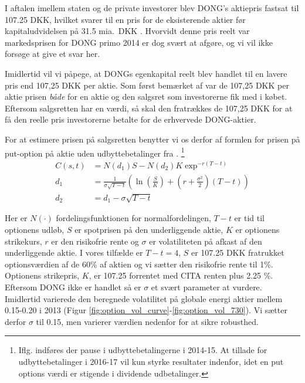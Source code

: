 \documentclass{article}
\begin{document}
I aftalen imellem staten og de private investorer blev  DONG's aktiepris fastsat til 107.25 DKK, hvilket svarer til en pris for de eksisterende aktier før kapitaludvidelsen på 31.5 mia.\ DKK \citep{FM2013a}. Hvorvidt denne pris reelt var markedsprisen for DONG primo 2014 er dog svært at afgøre, og vi vil ikke forsøge at give et svar her. 

Imidlertid vil vi påpege, at DONGs egenkapital reelt blev handlet til en lavere pris end 107,25 DKK per aktie. Som først bemærket af \cite{Moeller2014} var de 107,25 DKK per aktie prisen \emph{både} for en aktie og den salgsret som investorerne fik med i købet. Eftersom salgsretten har en værdi, så skal den fratrækkes de 107,25 DKK for at få den reelle pris investorerne betalte for de erhvervede DONG-aktier.

For at estimere prisen på salgsretten benytter vi os derfor af formlen for prisen på put-option på aktie uden udbyttebetalinger fra \cite{Black1973}. \footnote{Iflg. \cite{FM2013a} indføres der pause i udbyttebetalingerne i 2014-15. At tillade for udbyttebetalinger i 2016-17 vil kun styrke resultater indenfor, idet en put options værdi er stigende i dividende udbetalinger.} 
	\begin{align}
C(s,t)&=N(d_1)S-N(d_2)K \exp^{-r(T-t)} \\
d_1&= \frac{1}{\sigma\sqrt{T-t}}\left( \ln\left( \frac{S}{K} \right)+\left(r+\frac{\sigma^2}{2} \right)(T-t) \right) \nonumber \\
d_2&=d_1-\sigma \sqrt{T-t} \nonumber
\end{align}

Her er $N(\cdot)$ fordelingsfunktionen for normalfordelingen, $T-t$ er tid til optionens udløb, $S$ er spotprisen på den underliggende aktie, $K$ er optionens strikekurs, $r$ er den risikofrie rente og $\sigma$ er volatiliteten på afkast af den underliggende aktie. I vores tilfælde er $T-t=4$, $S$ er 107.25 DKK fratrukket optionsværdien af de 60\% af aktien og vi sætter den risikofrie rente til 1\%. Optionens strikepris, $K$, er 107.25 forrentet med CITA renten plus 2.25 \%. Eftersom DONG ikke er handlet så er $\sigma$ et svært parameter at vurdere. Imidlertid varierede den  beregnede volatilitet på globale energi aktier mellem 0.15-0.20 i 2013 (Figur \ref{fig:option_vol_curve}-\ref{fig:option_vol_730}). Vi sætter derfor $\sigma$ til 0.15, men varierer værdien nedenfor for at sikre robusthed. 
\end{document}
